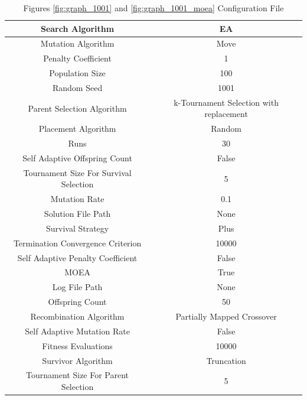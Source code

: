 \documentclass{standalone}
\begin{document}
\begin{table}[!htb]
	\centering
	\caption{Figures \ref{fig:graph_1001} and \ref{fig:graph_1001_moea} Configuration File}
	\label{tab:graph_1001}
	\begin{tabular}{| c | c |}
		\hline
		Search Algorithm		& EA		 \\
		\hline
		Mutation Algorithm		& Move		 \\
		\hline
		Penalty Coefficient		& 1		 \\
		\hline
		Population Size		& 100		 \\
		\hline
		Random Seed		& 1001		 \\
		\hline
		Parent Selection Algorithm		& k-Tournament Selection with replacement		 \\
		\hline
		Placement Algorithm		& Random		 \\
		\hline
		Runs		& 30		 \\
		\hline
		Self Adaptive Offspring Count		& False		 \\
		\hline
		Tournament Size For Survival Selection		& 5		 \\
		\hline
		Mutation Rate		& 0.1		 \\
		\hline
		Solution File Path		& None		 \\
		\hline
		Survival Strategy		& Plus		 \\
		\hline
		Termination Convergence Criterion		& 10000		 \\
		\hline
		Self Adaptive Penalty Coefficient		& False		 \\
		\hline
		MOEA		& True		 \\
		\hline
		Log File Path		& None		 \\
		\hline
		Offspring Count		& 50		 \\
		\hline
		Recombination Algorithm		& Partially Mapped Crossover		 \\
		\hline
		Self Adaptive Mutation Rate		& False		 \\
		\hline
		Fitness Evaluations		& 10000		 \\
		\hline
		Survivor Algorithm		& Truncation		 \\
		\hline
		Tournament Size For Parent Selection		& 5		 \\
		\hline
	\end{tabular}
\end{table}
\end{document}
